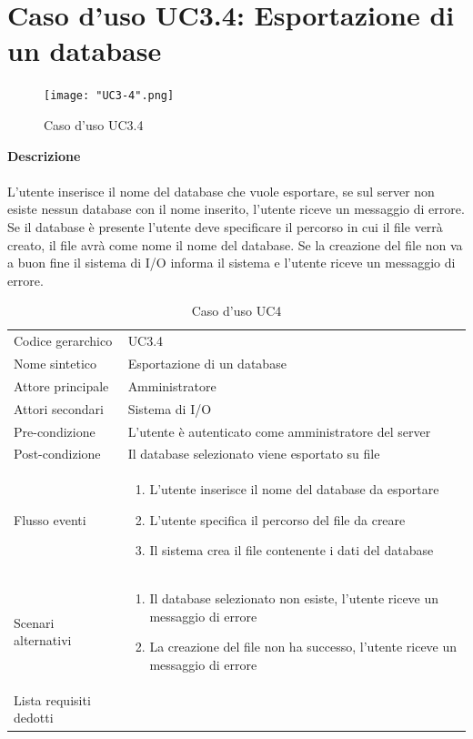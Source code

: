 \documentclass[a4paper]{report}
\begin{document}
	 \section{Caso d'uso UC3.4: Esportazione di un database}
	 	\begin{figure}[H]
			\centering
			\texttt{[image: "UC3-4".png]}
			\caption{Caso d'uso UC3.4}
		\end{figure}
	 \textbf{Descrizione} \\ \\
	 L'utente inserisce il nome del database che vuole esportare, se sul server non esiste nessun database 
	 con il nome inserito, l'utente riceve un messaggio di errore. \\
	 Se il database è presente l'utente deve specificare il percorso in cui il file verrà creato, il file avrà come
	 nome il nome del database. Se la creazione del file non va a buon fine il sistema di I/O informa il 
	 sistema e l'utente riceve un messaggio di errore.
		\begin{table}[H]
		\begin{tabularx}{\textwidth}{X | X}\toprule
			\rowcolor{orange!65}Codice gerarchico & UC3.4 \\
			Nome sintetico & Esportazione di un database \\
			\rowcolor{orange!65}Attore principale & Amministratore\\
			Attori secondari & Sistema di I/O \\
			\rowcolor{orange!65}Pre-condizione & L'utente è autenticato come amministratore del server\\
			Post-condizione & Il database selezionato viene esportato su file \\
			\rowcolor{orange!65}Flusso eventi & \begin{enumerate}
			\item L'utente inserisce il nome del database da esportare
			\item L'utente specifica il percorso del file da creare
			\item Il sistema crea il file contenente i dati del database
			\end{enumerate} \\
			Scenari alternativi & \begin{enumerate}
			\item Il database selezionato non esiste, l'utente riceve un messaggio di errore
			\item La creazione del file non ha successo, l'utente riceve un messaggio di errore
			\end{enumerate} \\
			\rowcolor{orange!65}Lista requisiti dedotti & \\
			\bottomrule
		\end{tabularx}
		\caption{Caso d'uso UC4}
	 \end{table}
\end{document}
